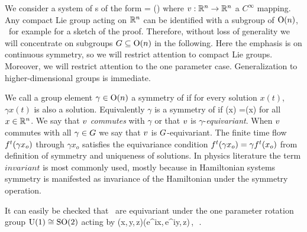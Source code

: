

We consider a system of \ode s of the form
\beq
	\dot{\ssp} = \vf(\ssp)
	\label{eq:difeq}
\eeq
where $v: \mathbb{R}^{n} \rightarrow \mathbb{R}^{n}$ a $C^\infty$ mapping.
Any compact Lie group acting on $\mathbb{R}^{n}$ can be identified
with a subgroup of $\textrm{O}(n)$, \cf\ for example 
for a sketch of the proof. Therefore, without loss of generality
we will concentrate on subgroups $G\subseteq\textrm{O}(n)$ in the following.
Here the emphasis is on continuous symmetry, so we will restrict attention
to compact Lie groups. Moreover, we will restrict attention to the one parameter case.
Generalization to higher-dimensional groups is immediate.

We call a group element $\gamma\in\textrm{O}(n)$ a symmetry of
 if for every solution $x(t)$, $\gamma x(t)$
is also a solution. Equivalently $\gamma$ is a symmetry of  if
\beq
	\vf(\gamma x) =\gamma \vf(x)
	\label{eq:equiv}
\eeq
for all $x\in\mathbb{R}^{n}$. We say that $v$ \emph{commutes} with
$\gamma$ or that $v$ is $\gamma$-\emph{equivariant}. When
$v$ commutes with all $\gamma\in G$ we say that $v$
is $G$-equivariant. The finite time flow
${f^{t}(\gamma x_o)}$ through $\gamma x_o$ satisfies the
equivariance condition ${f^{t}(\gamma x_o)}=\gamma
{f^{t}(x_o)}$ from definition of symmetry and uniqueness of
solutions. In physics literature the term $invariant$ is most
commonly used, mostly because in Hamiltonian systems symmetry
is manifested as invariance of the Hamiltonian under the
symmetry operation.

It can easily be checked that \CLe\ are equivariant under the one parameter rotation
group $\textrm{U}(1)\cong\textrm{SO}(2)$ acting by
\beq
	(x,\,y,\,z)\mapsto (e^{i\theta}x,\,e^{i\theta}y,\,z)\,,\ \theta\in[0,2\pi]\,.
\eeq

